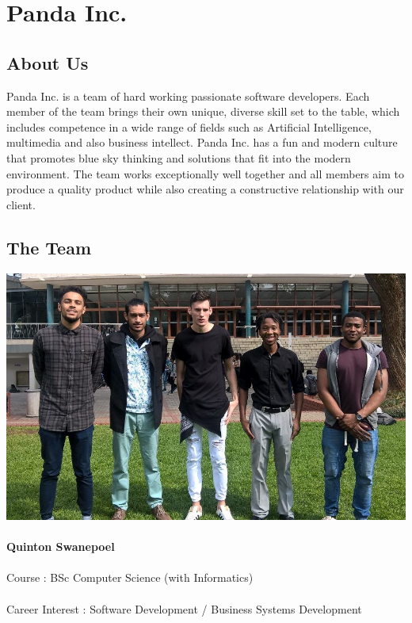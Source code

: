 \documentclass[11pt]{article}
\begin{document}
\newpage

\section{Panda Inc.}
\subsection{About Us}
Panda Inc. is a team of hard working passionate software developers. Each member of the team brings their own unique, diverse skill set to the table, which includes competence in a wide range of fields such as Artificial Intelligence, multimedia and also business intellect. Panda Inc. has a fun and modern culture that promotes blue sky thinking and solutions that fit into the modern environment. The team works exceptionally well together and all members aim to produce a quality product while also creating a constructive relationship with our client.

\subsection{The Team}
\includegraphics[width=\textwidth]{Images/Team_Pic.jpg}

\paragraph{} \textbf{Quinton Swanepoel} 
\paragraph{}Course : BSc Computer Science (with Informatics)
\paragraph{}Career Interest : Software Development / Business Systems Development  
\end{document}
